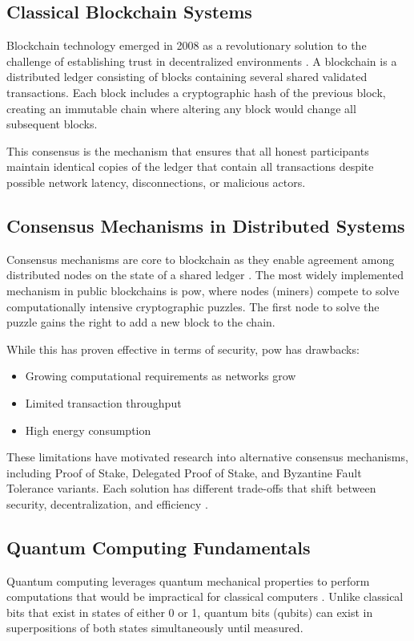 \documentclass[11pt,a4paper]{article}
\begin{document}
\subsection{Classical Blockchain Systems}
Blockchain technology emerged in 2008 as a revolutionary solution to the challenge of establishing trust in decentralized environments \cite{nakamoto2008bitcoin}. A blockchain is a distributed ledger consisting of blocks containing several shared validated transactions. Each block includes a cryptographic hash of the previous block, creating an immutable chain where altering any block would change all subsequent blocks.

This consensus is the mechanism that ensures that all honest participants maintain identical copies of the ledger that contain all transactions despite possible network latency, disconnections, or malicious actors.

\subsection{Consensus Mechanisms in Distributed Systems}
Consensus mechanisms are core to blockchain as they enable agreement among distributed nodes on the state of a shared ledger \cite{investopedia_consensus}. The most widely implemented mechanism in public blockchains is \gls{pow}, where nodes (miners) compete to solve computationally intensive cryptographic puzzles. The first node to solve the puzzle gains the right to add a new block to the chain.

While this has proven effective in terms of security, \gls{pow} has drawbacks:
\begin{itemize}
    \item Growing computational requirements as networks grow
    \item Limited transaction throughput
    \item High energy consumption
\end{itemize}

These limitations have motivated research into alternative consensus mechanisms, including Proof of Stake, Delegated Proof of Stake, and Byzantine Fault Tolerance variants. Each solution has different trade-offs that shift between security, decentralization, and efficiency \cite{ethereum_consensus}.

\subsection{Quantum Computing Fundamentals}
Quantum computing leverages quantum mechanical properties to perform computations that would be impractical for classical computers \cite{nielsen2010quantum}. Unlike classical bits that exist in states of either 0 or 1, quantum bits (\glspl{qubit}) can exist in superpositions of both states simultaneously until measured.
\end{document}
